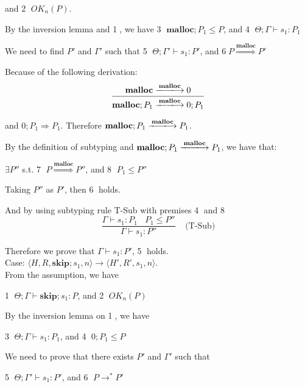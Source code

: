 \documentclass[english]{jssst_ppl} %
\newcommand\SKIP{\mathbf{skip}}
\newcommand\Rtab{\; \; \; \;}
\newcommand\Malloc{\mathbf{malloc}}
\theoremstyle{definition}
\begin{document}
and \textcircled{2} $OK_{n}(P)$.

By the inversion lemma and \textcircled{1}, we have \textcircled{3} $\Malloc;P_{1} \le P$, and \textcircled{4} $\Theta; \Gamma \vdash s_{1} : P_{1}$

We need to find $P'$ and $\Gamma'$ such that \textcircled{5} $\Theta; \Gamma' \vdash s_{1} : P'$, and \textcircled{6}$P \overset{\text{$\Malloc$}}{\Longrightarrow} P'$

Because of the following derivation:
$$
  \frac{ \Malloc \xlongrightarrow{\Malloc} 0}
  {\Malloc;P_{1} \xlongrightarrow{\Malloc} 0;P_{1}}
$$

and $0;P_{1} \Rightarrow P_{1}$. Therefore $\Malloc;P_{1} \xlongrightarrow{\Malloc} P_{1}$.

By the definition of subtyping and $\Malloc;P_{1} \xlongrightarrow{\Malloc} P_{1}$, we have that:
\begin{center}
$\exists P''$ s.t. \textcircled{7} $P \overset{\text{$\Malloc$}}{\Longrightarrow} P''$, and \textcircled{8} $P_{1} \le P''$
 \end{center}

Taking $P''$ as $P'$, then \textcircled{6} holds.

And by using subtyping rule T-Sub with premises \textcircled{4} and \textcircled{8}
$$
    \frac{\Gamma \vdash s_{1} : P_{1} \ \ \ \ P_{1} \le P''}
     {\Gamma \vdash s_{1} : P''}
     \Rtab \mbox{(T-Sub)}
$$

Therefore we prove that $\Gamma \vdash s_{1} : P'$, \textcircled{5} holds.\\

\noindent Case: $\langle H, R, \SKIP;s_{1}, n \rangle \rightarrow \langle H', R', s_{1}, n \rangle $. \\

From the assumption, we have
\begin{center}
\textcircled{1} $\Theta; \Gamma \vdash \SKIP;s_{1} : P$, and \textcircled{2} $OK_{n}(P)$
\end{center}

By the inversion lemma on \textcircled{1}, we have
\begin{center}
\textcircled{3} $\Theta; \Gamma \vdash s_{1} : P_{1}$, and \textcircled{4} $0;P_{1} \le P $
\end{center}

We need to prove that there exists $P'$ and $\Gamma'$ such that
\begin{center}
\textcircled{5} $\Theta; \Gamma' \vdash s_{1} : P'$, and \textcircled{6} $P \rightarrow^{*} P'$
\end{center}
\end{document}

